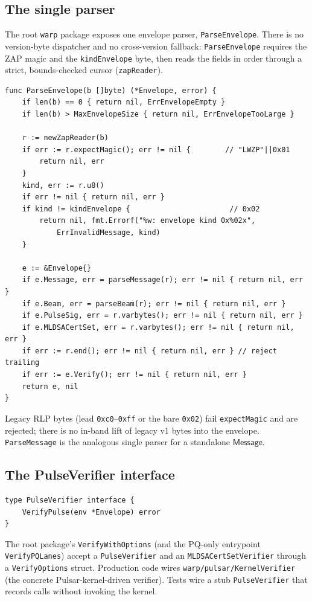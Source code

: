 \subsection{The single parser}

The root \texttt{warp} package exposes one envelope parser, \texttt{ParseEnvelope}. There is no version-byte dispatcher and no cross-version fallback: \texttt{ParseEnvelope} requires the ZAP magic and the \texttt{kindEnvelope} byte, then reads the fields in order through a strict, bounds-checked cursor (\texttt{zapReader}).

\begin{verbatim}
func ParseEnvelope(b []byte) (*Envelope, error) {
    if len(b) == 0 { return nil, ErrEnvelopeEmpty }
    if len(b) > MaxEnvelopeSize { return nil, ErrEnvelopeTooLarge }

    r := newZapReader(b)
    if err := r.expectMagic(); err != nil {        // "LWZP"||0x01
        return nil, err
    }
    kind, err := r.u8()
    if err != nil { return nil, err }
    if kind != kindEnvelope {                       // 0x02
        return nil, fmt.Errorf("%w: envelope kind 0x%02x",
            ErrInvalidMessage, kind)
    }

    e := &Envelope{}
    if e.Message, err = parseMessage(r); err != nil { return nil, err }
    if e.Beam, err = parseBeam(r); err != nil { return nil, err }
    if e.PulseSig, err = r.varbytes(); err != nil { return nil, err }
    if e.MLDSACertSet, err = r.varbytes(); err != nil { return nil, err }
    if err := r.end(); err != nil { return nil, err } // reject trailing
    if err := e.Verify(); err != nil { return nil, err }
    return e, nil
}
\end{verbatim}

Legacy RLP bytes (lead \texttt{0xc0}--\texttt{0xff} or the bare \texttt{0x02}) fail \texttt{expectMagic} and are rejected; there is no in-band lift of legacy v1 bytes into the envelope. \texttt{ParseMessage} is the analogous single parser for a standalone $\mathsf{Message}$.

\subsection{The PulseVerifier interface}

\begin{verbatim}
type PulseVerifier interface {
    VerifyPulse(env *Envelope) error
}
\end{verbatim}

The root package's \texttt{VerifyWithOptions} (and the PQ-only entrypoint \texttt{VerifyPQLanes}) accept a \texttt{PulseVerifier} and an \texttt{MLDSACertSetVerifier} through a \texttt{VerifyOptions} struct. Production code wires \texttt{warp/pulsar/KernelVerifier} (the concrete Pulsar-kernel-driven verifier). Tests wire a stub \texttt{PulseVerifier} that records calls without invoking the kernel.

